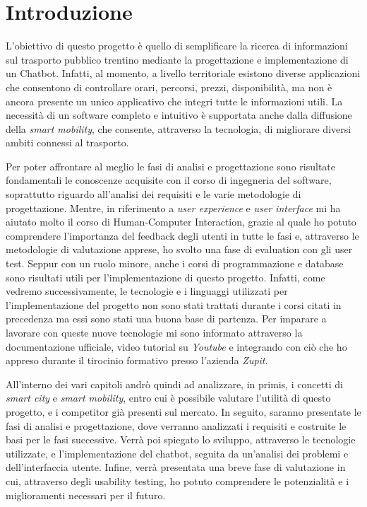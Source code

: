 \chapter{Introduzione}
\label{cha:introduzione}

L'obiettivo di questo progetto è quello di semplificare la ricerca di informazioni sul trasporto pubblico trentino mediante la progettazione e implementazione di un Chatbot. Infatti, al momento, a livello territoriale esistono diverse applicazioni che consentono di controllare orari, percorsi, prezzi, disponibilità, ma non è ancora presente un unico applicativo che integri tutte le informazioni utili. La necessità di un software completo e intuitivo è supportata anche dalla diffusione della \textit{smart mobility}, che consente, attraverso la tecnologia, di migliorare diversi ambiti connessi al trasporto.


Per poter affrontare al meglio le fasi di analisi e progettazione sono risultate fondamentali le conoscenze acquisite con il corso di ingegneria del software, soprattutto riguardo all'analisi dei requisiti e le varie metodologie di progettazione. Mentre, in riferimento a \textit{user experience} e \textit{user interface} mi ha aiutato molto il corso di Human-Computer Interaction, grazie al quale ho potuto comprendere l'importanza del feedback degli utenti in tutte le fasi e, attraverso le metodologie di valutazione apprese, ho svolto una fase di evaluation con gli user test. Seppur con un ruolo minore, anche i corsi di programmazione e database sono risultati utili per l'implementazione di questo progetto. Infatti, come vedremo successivamente, le tecnologie e i linguaggi utilizzati per l'implementazione del progetto non sono stati trattati durante i corsi citati in precedenza ma essi sono stati una buona base di partenza. Per imparare a lavorare con queste nuove tecnologie mi sono informato attraverso la documentazione ufficiale, video tutorial su \textit{Youtube} e integrando con ciò che ho appreso durante il tirocinio formativo presso l'azienda \textit{Zupit}. 

All'interno dei vari capitoli andrò quindi ad analizzare, in primis, i concetti di \textit{smart city} e \textit{smart mobility}, entro cui è possibile valutare l'utilità di questo progetto, e i competitor già presenti sul mercato. In seguito, saranno presentate le fasi di analisi e progettazione, dove verranno analizzati i requisiti e costruite le basi per le fasi successive. Verrà poi spiegato lo sviluppo, attraverso le tecnologie utilizzate, e l'implementazione del chatbot, seguita da un'analisi dei problemi e dell'interfaccia utente. Infine, verrà presentata una breve fase di valutazione in cui, attraverso degli usability testing, ho potuto comprendere le potenzialità e i miglioramenti necessari per il futuro.  